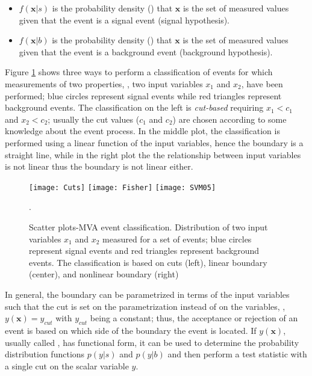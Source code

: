 \begin{itemize}
\item $f(\textbf{x}|s)$ is the probability density () that $\textbf{x}$ is the set of measured values given that the event is a signal event (signal hypothesis). 
\item $f(\textbf{x}|b)$ is the probability density () that $\textbf{x}$ is the set of measured values given that the event is a background event (background hypothesis).
\end{itemize}

Figure \ref{fig:scatter_plot} shows three ways to perform a classification of events for which measurements of two properties, \ie, two input variables $x_1$ and $x_2$, have been performed; blue circles represent signal events while red triangles represent background events. The classification on the left is \textit{cut-based} requiring $x_1<c_1$ and $x_2<c_2$; usually the cut values ($c_1$ and $c_2$) are chosen according to some knowledge about the event process. In the middle plot, the classification is performed using a linear function of the input variables, hence the boundary is a straight line, while in the right plot the the relationship between input variables is not linear thus the boundary is not linear either.          

\begin{figure}[!h]
  \centering
  \texttt{[image: Cuts]}
  \texttt{[image: Fisher]}
  \texttt{[image: SVM05]}
  \caption[Scatter plots-MVA event classification.]{Scatter plots-MVA event classification. Distribution of two input variables $x_1$ and $x_2$ measured for a set of events; blue circles represent signal events and red triangles represent background events. The classification is based on cuts (left), linear boundary (center), and nonlinear boundary (right)\cite{mva}}\label{fig:scatter_plot}.
\end{figure}

In general, the boundary can be parametrized in terms of the input variables such that the cut is set on the parametrization instead of on the variables, \ie, $y(\textbf{x})=y_{cut}$ with $y_{cut}$ being a constant; thus, the acceptance or rejection of an event is based on which side of the boundary the event is located. If $y(\textbf{x})$, usually called , has functional form, it can be used to determine the probability distribution functions $p(y|s)$ and $p(y|b)$ and then perform a test statistic with a single cut on the scalar variable $y$. 

